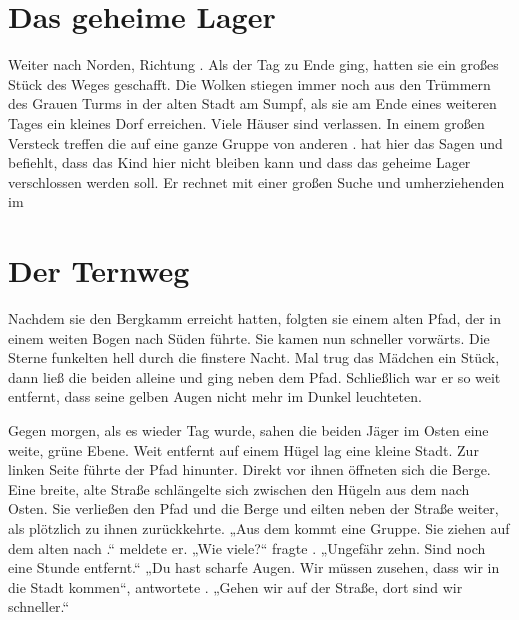 \begin{huge}
\section{Das geheime Lager}
Weiter nach Norden, Richtung \Nordmark. Als der Tag zu Ende ging, hatten sie ein großes Stück des Weges geschafft. Die Wolken stiegen immer noch aus den Trümmern des Grauen Turms in der alten Stadt am Sumpf, als sie am Ende eines weiteren Tages ein kleines Dorf erreichen. Viele Häuser sind verlassen. In einem großen Versteck treffen die \Schattenjager auf eine ganze Gruppe von anderen . \Nox hat hier das Sagen und befiehlt, dass das Kind hier nicht bleiben kann und dass das geheime Lager verschlossen werden soll. Er rechnet mit einer großen Suche und umherziehenden \Bangiri im 

\section{Der Ternweg}
Nachdem sie den Bergkamm erreicht hatten, folgten sie einem alten Pfad, der in einem weiten Bogen nach Süden führte. Sie kamen nun schneller vorwärts. Die Sterne funkelten hell durch die finstere Nacht. Mal trug \Eno das Mädchen ein Stück, dann \Bomar  \Dolo ließ die beiden alleine und ging neben dem Pfad. Schließlich war er so weit entfernt, dass seine gelben Augen nicht mehr im Dunkel leuchteten.

Gegen morgen, als es wieder Tag wurde, sahen die beiden Jäger im Osten eine weite, grüne Ebene. Weit entfernt auf einem Hügel lag eine kleine Stadt. Zur linken Seite führte der Pfad hinunter. Direkt vor ihnen öffneten sich die Berge. Eine breite, alte Straße schlängelte sich zwischen den Hügeln aus dem \Enland nach Osten. Sie verließen den Pfad und die Berge und eilten neben der Straße weiter, als \Dolo plötzlich zu ihnen zurückkehrte. „Aus dem \Enland kommt eine Gruppe. Sie ziehen auf dem alten  nach \Lobarn.“ meldete er. „Wie viele?“ fragte \Eno. „Ungefähr zehn. Sind noch eine Stunde entfernt.“ „Du hast scharfe Augen. Wir müssen zusehen, dass wir in die Stadt kommen“, antwortete \Eno. „Gehen wir auf der Straße, dort sind wir schneller.“


\end{huge}
